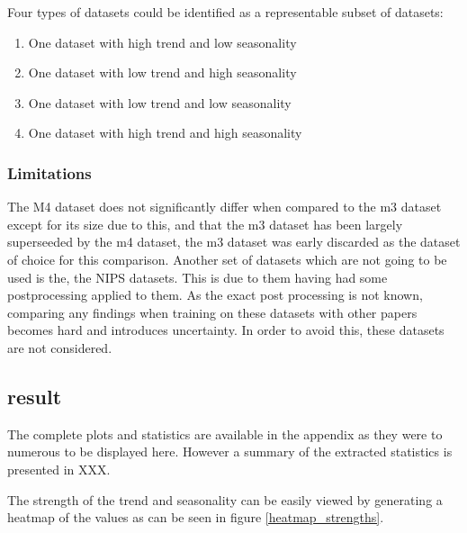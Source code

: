 Four types of datasets could be identified as a representable subset of datasets:

\begin{enumerate}
\item One dataset with high trend and low seasonality
\item One dataset with low trend and high seasonality
\item One dataset with low trend and low seasonality
\item One dataset with high trend and high seasonality
\end{enumerate}
\label{dataset_criteria}

\subsubsection{Limitations}
The M4 dataset does not significantly differ when compared to the m3 dataset except for its size \cite{m3_vs_m4} due to this, and that the m3 dataset has been largely superseeded by the m4 dataset, the m3 dataset was early discarded as the dataset of choice for this comparison. 
Another set of datasets which are not going to be used is the, the NIPS datasets. This is due to them having had some postprocessing applied to them. As the exact post processing is not known, comparing any findings when training on these datasets with other papers becomes hard and introduces uncertainty. In order to avoid this, these datasets are not considered. 

\subsection{result}
The complete plots and statistics are available in the appendix as they were to numerous to be displayed here. However a summary of the extracted statistics is presented in XXX.

The strength of the trend and seasonality can be easily viewed by generating a heatmap of the values as can be seen in figure \ref{heatmap_strengths}. 

